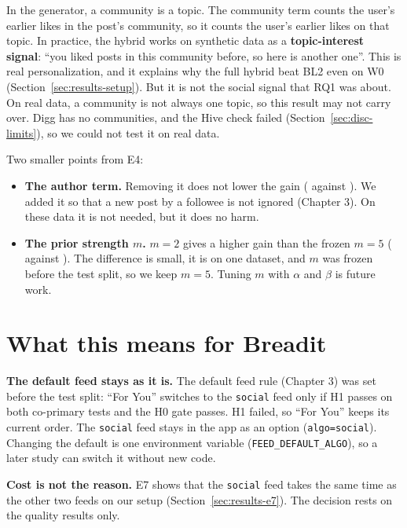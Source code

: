 In the generator, a community is a topic. The community term counts the user's earlier likes in the post's community, so it counts the user's earlier likes on that topic. In practice, the hybrid works on synthetic data as a \textbf{topic-interest signal}: ``you liked posts in this community before, so here is another one''. This is real personalization, and it explains why the full hybrid beat BL2 even on W0 (Section~\ref{sec:results-setup}). But it is not the social signal that RQ1 was about. On real data, a community is not always one topic, so this result may not carry over. Digg has no communities, and the Hive check failed (Section~\ref{sec:disc-limits}), so we could not test it on real data.

Two smaller points from E4:
\begin{itemize}
  \item \textbf{The author term.} Removing it does not lower the gain (\eFourWTwoMNdcgHNoauthorTenAllGain{} against \eFourWTwoMNdcgHTenAllGain{}). We added it so that a new post by a followee is not ignored (Chapter 3). On these data it is not needed, but it does no harm.
  \item \textbf{The prior strength $m$.} $m = 2$ gives a higher gain than the frozen $m = 5$ (\eFourWTwoMNdcgHMTwoTenAllGain{} against \eFourWTwoMNdcgHTenAllGain{}). The difference is small, it is on one dataset, and $m$ was frozen before the test split, so we keep $m = 5$. Tuning $m$ with $\alpha$ and $\beta$ is future work.
\end{itemize}

\section{What this means for Breadit}
\label{sec:disc-breadit}

\textbf{The default feed stays as it is.} The default feed rule (Chapter 3) was set before the test split: ``For You'' switches to the \texttt{social} feed only if H1 passes on both co-primary tests and the H0 gate passes. H1 failed, so ``For You'' keeps its current order. The \texttt{social} feed stays in the app as an option (\texttt{algo=social}). Changing the default is one environment variable (\texttt{FEED\_DEFAULT\_ALGO}), so a later study can switch it without new code.

\textbf{Cost is not the reason.} E7 shows that the \texttt{social} feed takes the same time as the other two feeds on our setup (Section~\ref{sec:results-e7}). The decision rests on the quality results only.


